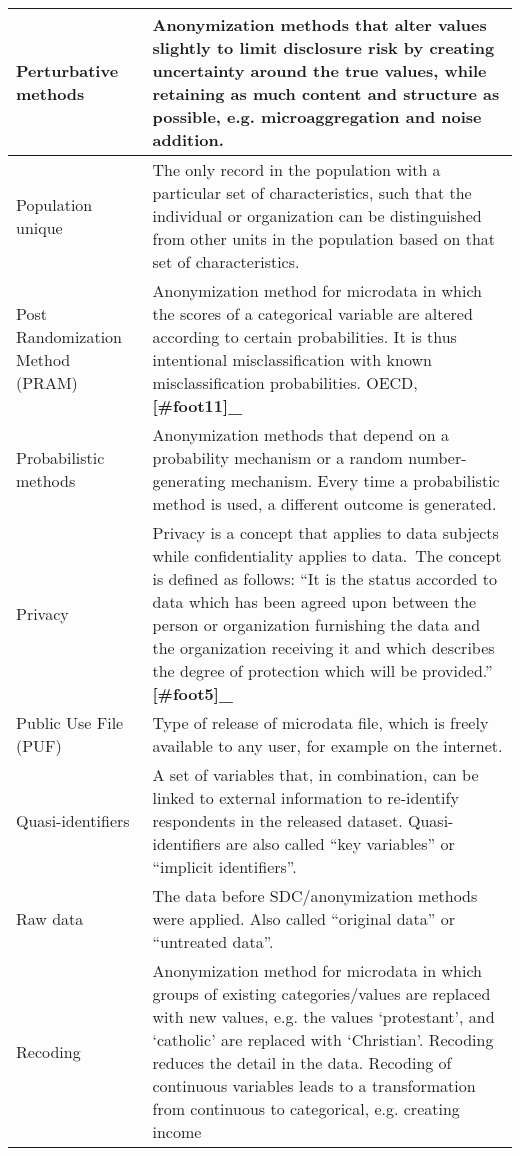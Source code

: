 \documentclass[letterpaper,10pt,english]{sphinxmanual}
\begin{document}
\begin{savenotes}
\begin{longtable}{|l|l|}
\hline
Perturbative methods
&
Anonymization methods that alter
values slightly to limit
disclosure risk by creating
uncertainty around the true
values, while retaining as much
content and structure as
possible, e.g. microaggregation
and noise addition.
\\
\hline
Population unique
&
The only record in the population
with a particular set of
characteristics, such that the
individual or organization can be
distinguished from other units in
the population based on that set
of characteristics.
\\
\hline
Post Randomization Method (PRAM)
&
Anonymization method for
microdata in which the scores of
a categorical variable are
altered according to certain
probabilities. It is thus
intentional misclassification
with known misclassification
probabilities. OECD, {\color{red}\bfseries{}{[}\#foot11{]}\_}
\\
\hline
Probabilistic methods
&
Anonymization methods that depend
on a probability mechanism or a
random number-generating
mechanism. Every time a
probabilistic method is used, a
different outcome is generated.
\\
\hline
Privacy
&
Privacy is a concept that applies
to data subjects while
confidentiality applies to
data. The concept is defined as
follows: “It is the status
accorded to data which has been
agreed upon between the person or
organization furnishing the data
and the organization receiving it
and which describes the degree of
protection which will be
provided.” {\color{red}\bfseries{}{[}\#foot5{]}\_}
\\
\hline
Public Use File (PUF)
&
Type of release of microdata
file, which is freely available
to any user, for example on the
internet.
\\
\hline
Quasi-identifiers
&
A set of variables that, in
combination, can be linked to
external information to
re-identify respondents in the
released dataset.
Quasi-identifiers are also called
“key variables” or “implicit
identifiers”.
\\
\hline
Raw data
&
The data before SDC/anonymization
methods were applied. Also called
“original data” or “untreated
data”.
\\
\hline
Recoding
&
Anonymization method for
microdata in which groups of
existing categories/values are
replaced with new values, e.g.
the values ‘protestant’, and
‘catholic’ are replaced with
‘Christian’. Recoding reduces the
detail in the data. Recoding of
continuous variables leads to a
transformation from continuous to
categorical, e.g. creating income

\end{longtable}
\end{savenotes}
\end{document}
